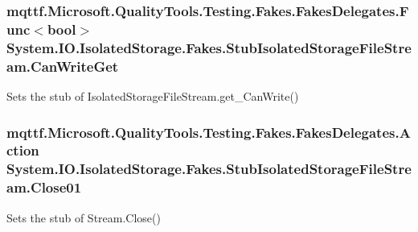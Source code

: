 \hypertarget{class_system_1_1_i_o_1_1_isolated_storage_1_1_fakes_1_1_stub_isolated_storage_file_stream_acaa51ed6ae78655d8931d8fc40d122c3}{
\subsubsection[{Can\-Write\-Get}]{\setlength{\rightskip}{0pt plus 5cm}mqttf.\-Microsoft.\-Quality\-Tools.\-Testing.\-Fakes.\-Fakes\-Delegates.\-Func$<$bool$>$ System.\-I\-O.\-Isolated\-Storage.\-Fakes.\-Stub\-Isolated\-Storage\-File\-Stream.\-Can\-Write\-Get}}\label{class_system_1_1_i_o_1_1_isolated_storage_1_1_fakes_1_1_stub_isolated_storage_file_stream_acaa51ed6ae78655d8931d8fc40d122c3}


Sets the stub of Isolated\-Storage\-File\-Stream.\-get\-\_\-\-Can\-Write()

\hypertarget{class_system_1_1_i_o_1_1_isolated_storage_1_1_fakes_1_1_stub_isolated_storage_file_stream_a1e27013de47e3f666818ff2c4896a75f}{
\subsubsection[{Close01}]{\setlength{\rightskip}{0pt plus 5cm}mqttf.\-Microsoft.\-Quality\-Tools.\-Testing.\-Fakes.\-Fakes\-Delegates.\-Action System.\-I\-O.\-Isolated\-Storage.\-Fakes.\-Stub\-Isolated\-Storage\-File\-Stream.\-Close01}}\label{class_system_1_1_i_o_1_1_isolated_storage_1_1_fakes_1_1_stub_isolated_storage_file_stream_a1e27013de47e3f666818ff2c4896a75f}


Sets the stub of Stream.\-Close()

